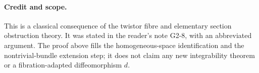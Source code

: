 \paragraph{Credit and scope.}
This is a classical consequence of the twistor fibre and elementary
section obstruction theory. It was stated in the reader's note G2-8,
with an abbreviated argument. The proof above fills the homogeneous-space
identification and the nontrivial-bundle extension step; it does not
claim any new integrability theorem or a fibration-adapted
diffeomorphism $d$.
